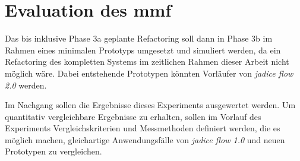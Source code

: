 \section{Evaluation des \gls{mmf}}

Das bis inklusive Phase 3a geplante Refactoring soll dann in Phase 3b im Rahmen eines minimalen Prototyps umgesetzt und simuliert werden, da ein Refactoring des kompletten Systems im zeitlichen Rahmen dieser Arbeit nicht möglich wäre.
Dabei entstehende Prototypen könnten Vorläufer von \emph{jadice flow 2.0} werden.

Im Nachgang sollen die Ergebnisse dieses Experiments ausgewertet werden. Um quantitativ vergleichbare Ergebnisse zu erhalten, sollen im Vorlauf des Experiments Vergleichskriterien und Messmethoden definiert werden, die es möglich machen, gleichartige Anwendungsfälle von \emph{jadice flow 1.0} und neuen Prototypen zu vergleichen.
